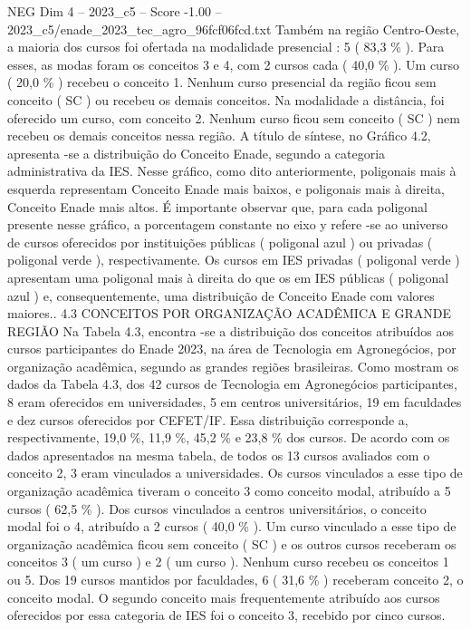 \begin{textsample}{NEG Dim 4 – 2023\_c5 – Score -1.00 – 2023\_c5/enade\_2023\_tec\_agro\_96fcf06fcd.txt}
Também na região Centro-Oeste, a maioria dos cursos foi ofertada na modalidade presencial : 5 ( 83,3 \% ).
Para esses, as modas foram os conceitos 3 e 4, com 2 cursos cada ( 40,0 \% ).
Um curso ( 20,0 \% ) recebeu o conceito 1.
Nenhum curso presencial da região ficou sem conceito ( SC ) ou recebeu os demais conceitos.
Na modalidade a distância, foi oferecido um curso, com conceito 2.
Nenhum curso ficou sem conceito ( SC ) nem recebeu os demais conceitos nessa região.
A título de síntese, no Gráfico 4.2, apresenta -se a distribuição do Conceito Enade, segundo a categoria administrativa da IES.
Nesse gráfico, como dito anteriormente, poligonais mais à esquerda representam Conceito Enade mais baixos, e poligonais mais à direita, Conceito Enade mais altos.
É importante observar que, para cada poligonal presente nesse gráfico, a porcentagem constante no eixo y refere -se ao universo de cursos oferecidos por instituições públicas ( poligonal azul ) ou privadas ( poligonal verde ), respectivamente.
Os cursos em IES privadas ( poligonal verde ) apresentam uma poligonal mais à direita do que os em IES públicas ( poligonal azul ) e, consequentemente, uma distribuição de Conceito Enade com valores maiores.. 4.3 CONCEITOS POR ORGANIZAÇÃO ACADÊMICA E GRANDE REGIÃO Na Tabela 4.3, encontra -se a distribuição dos conceitos atribuídos aos cursos participantes do Enade 2023, na área de Tecnologia em Agronegócios, por organização acadêmica, segundo as grandes regiões brasileiras.
Como mostram os dados da Tabela 4.3, dos 42 cursos de Tecnologia em Agronegócios participantes, 8 eram oferecidos em universidades, 5 em centros universitários, 19 em faculdades e dez cursos oferecidos por CEFET/IF.
Essa distribuição corresponde a, respectivamente, 19,0 \%, 11,9 \%, 45,2 \% e 23,8 \% dos cursos.
De acordo com os dados apresentados na mesma tabela, de todos os 13 cursos avaliados com o conceito 2, 3 eram vinculados a universidades.
Os cursos vinculados a esse tipo de organização acadêmica tiveram o conceito 3 como conceito modal, atribuído a 5 cursos ( 62,5 \% ).
Dos cursos vinculados a centros universitários, o conceito modal foi o 4, atribuído a 2 cursos ( 40,0 \% ).
Um curso vinculado a esse tipo de organização acadêmica ficou sem conceito ( SC ) e os outros cursos receberam os conceitos 3 ( um curso ) e 2 ( um curso ).
Nenhum curso recebeu os conceitos 1 ou 5.
Dos 19 cursos mantidos por faculdades, 6 ( 31,6 \% ) receberam conceito 2, o conceito modal.
O segundo conceito mais frequentemente atribuído aos cursos oferecidos por essa categoria de IES foi o conceito 3, recebido por cinco cursos.

\end{textsample}
